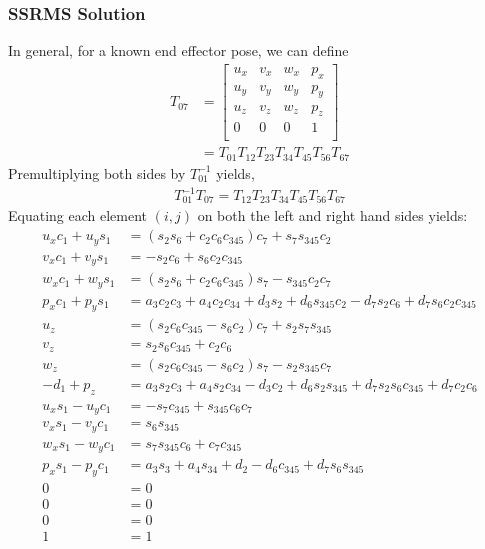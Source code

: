 \documentclass{article}
\begin{document}
\subsubsection{SSRMS Solution}
In general, for a known end effector pose, we can define~\cite{mae225_notes}
\begin{align*}
T_{07} &=
\left[\begin{matrix}
u_x & v_x & w_x & p_x \\
u_y & v_y & w_y & p_y \\
u_z & v_z & w_z & p_z \\
  0 &   0 &   0 &   1 \\
\end{matrix}\right]\\
&= T_{01} T_{12} T_{23} T_{34} T_{45} T_{56} T_{67}
\end{align*}
Premultiplying both sides by $T_{01}^{-1}$ yields,
\begin{align*}
T_{01}^{-1} T_{07} = T_{12} T_{23} T_{34} T_{45} T_{56} T_{67}
\end{align*}
Equating each element $(i,j)$ on both the left and right hand sides yields:
\begin{align}
u_x c_1 + u_y s_1 &= \left(s_{2} s_{6} + c_{2} c_{6} c_{345}\right) c_{7} + s_{7} s_{345} c_{2} \label{eq1} \\
v_x c_1 + v_y s_1 &= - s_{2} c_{6} + s_{6} c_{2} c_{345} \label{eq5} \\
w_x c_1 + w_y s_1 &= \left(s_{2} s_{6} + c_{2} c_{6} c_{345}\right) s_{7} - s_{345} c_{2} c_{7} \label{eq7} \\
p_x c_1 + p_y s_1 &= a_{3} c_{2} c_{3} + a_{4} c_{2} c_{34} + d_{3} s_{2} + d_{6} s_{345} c_{2} - d_{7} s_{2} c_{6} + d_{7} s_{6} c_{2} c_{345} \label{eq3} \\
u_z                 &= \left(s_{2} c_{6} c_{345} - s_{6} c_{2}\right) c_{7} + s_{2} s_{7} s_{345} \label{eq2} \\
v_z                 &= s_{2} s_{6} c_{345} + c_{2} c_{6} \label{eq6} \\
w_z                 &= \left(s_{2} c_{6} c_{345} - s_{6} c_{2}\right) s_{7} - s_{2} s_{345} c_{7} \label{eq8} \\
- d_{1} + p_z       &= a_{3} s_{2} c_{3} + a_{4} s_{2} c_{34} - d_{3} c_{2} + d_{6} s_{2} s_{345} + d_{7} s_{2} s_{6} c_{345} + d_{7} c_{2} c_{6} \label{eq4} \\
u_x s_1 - u_y c_1 &= - s_{7} c_{345} + s_{345} c_{6} c_{7} \label{th51}\\
v_x s_1 - v_y c_1 &= s_{6} s_{345} \label{th53} \\
w_x s_1 - w_y c_1 &= s_{7} s_{345} c_{6} + c_{7} c_{345} \label{th52} \\
p_x s_1 - p_y c_1 &= a_{3} s_{3} + a_{4} s_{34} + d_{2} - d_{6} c_{345} + d_{7} s_{6} s_{345} \\
0                     &= 0 \\
0                     &= 0 \\
0                     &= 0 \\
1                     &= 1
\end{align}
\end{document}
